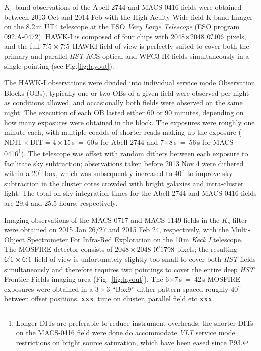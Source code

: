 \documentclass[iop, numberedappendix]{emulateapj}
\gdef\xxx{\textbf{xxx}}
\begin{document}
$K_s$-band observations of the Abell 2744 and MACS-0416 fields were obtained between 2013 Oct and 2014 Feb with the High Acuity Wide-field K-band Imager \citep[HAWK-I;][]{hawki, hawki2} on the 8.2\,m UT4 telescope at the ESO \textit{Very Large Telescope} (ESO program \mbox{092.A-0472}).  HAWK-I is composed of four chips with 2048$\times$2048 $0\mbox{$.\!\!^{\prime\prime}$}106$ pixels, and the full $7\mbox{$.\mkern-4mu^\prime$}5\times7\mbox{$.\mkern-4mu^\prime$}5$ HAWKI field-of-view is perfectly suited to cover both the primary and parallel \textit{HST} ACS optical and WFC3 IR fields simultaneously in a single pointing (see Fig.\ref{fig:layout}).

The HAWK-I observations were divided into individual service mode Observation Blocks (OBs); typically one or two OBs of a given field were observed per night as conditions allowed, and occasionally both fields were observed on the same night.  The execution of each OB lasted either 60 or 90 minutes, depending on how many exposures were obtained in the block.  The exposures were roughly one minute each, with multiple coadds of shorter reads making up the exposure ($\mathrm{NDIT}\times\mathrm{DIT} = 4\times15$\,s~=~60\,s for Abell 2744 and 7$\times$8\,s~=~56\,s for MACS-0416\footnote{Longer DITs are preferable to reduce instrument overheads; the shorter DITs on the MACS-0416 field were done do accommodate \textit{VLT} service mode restrictions on bright source saturation, which have been eased since P93.}).  The telescope was offset with random dithers between each exposure to facilitate sky subtraction;  observations taken before 2013 Nov 4 were dithered within a 20$^{\prime\prime}$ box, which was subsequently increased to 40$^{\prime\prime}$ to improve sky subtraction in the cluster cores crowded with bright galaxies and intra-cluster light.  The total on-sky integration times for the Abell 2744 and MACS-0416 fields are 29.4 and 25.5 hours, respectively.

Imaging observations of the MACS-0717 and MACS-1149 fields in the $K_s$ filter were obtained on 2015 Jan 26/27 and 2015 Feb 24, respectively, with the Multi-Object Spectrometer For Infra-Red Exploration \citep[MOSFIRE;][]{mosfire} on the 10\,m \textit{Keck I} telescope.  The MOSFIRE detector consists of $2048\times2048$ $0\mbox{$.\!\!^{\prime\prime}$}1798$ pixels; the resulting $6\mbox{$.\mkern-4mu^\prime$}1\times6\mbox{$.\mkern-4mu^\prime$}1$ field-of-view is unfortunately slightly too small to cover both \textit{HST} fields simultaneously and therefore requires two pointings to cover the entire deep \textit{HST} Frontier Fields imaging area (Fig.~\ref{fig:layout}).  The 6$\times$7\,s~=~42\,s MOSFIRE exposures were obtained in a $3\times3$ ``Box9'' dither pattern spaced roughly 40$^{\prime\prime}$ between offset positions.  \xxx\ time on cluster, parallel field etc \xxx.
\end{document}
